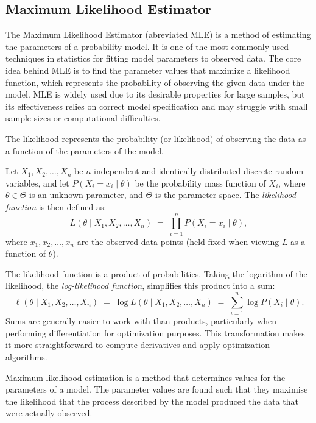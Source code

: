 
\subsection{Maximum Likelihood Estimator}

The Maximum Likelihood Estimator (abreviated MLE) is a method of estimating the parameters of a probability model. It is one of the most commonly used techniques in statistics for fitting model parameters to observed data. The core idea behind MLE is to find the parameter values that maximize a likelihood function, which represents the probability of observing the given data under the model. MLE is widely used due to its desirable properties for large samples, but its effectiveness relies on correct model specification and may struggle with small sample sizes or computational difficulties.

The likelihood represents the probability (or likelihood) of observing the data as a function of the parameters of the model.

\begin{definition}
Let \( X_1, X_2, \dots, X_n \) be $n$ independent and identically distributed discrete random variables, and let \( P(X_i = x_i \mid \theta) \) be the probability mass function of \( X_i \), where \( \theta \in \Theta \) is an unknown parameter, and \( \Theta \) is the parameter space. The \emph{likelihood function} is then defined as:
\[
L(\theta \mid X_1, X_2, \dots, X_n) \;=\; \prod_{i=1}^{n} P(X_i = x_i \mid \theta),
\]
where \( x_1, x_2, \dots, x_n \) are the observed data points (held fixed when viewing \(L\) as a function of \(\theta\)).
\end{definition}

The likelihood function is a product of probabilities. Taking the logarithm of the likelihood, the \emph{log-likelihood function}, simplifies this product into a sum:
\[
\ell(\theta \mid X_1, X_2, \dots, X_n)
\;=\; \log L(\theta \mid X_1, X_2, \dots, X_n)
\;=\; \sum_{i=1}^{n} \log P(X_i \mid \theta).
\]
Sums are generally easier to work with than products, particularly when performing differentiation for optimization purposes. This transformation makes it more straightforward to compute derivatives and apply optimization algorithms.

Maximum likelihood estimation is a method that determines values for the parameters of a model. The parameter values are found such that they maximise the likelihood that the process described by the model produced the data that were actually observed.

